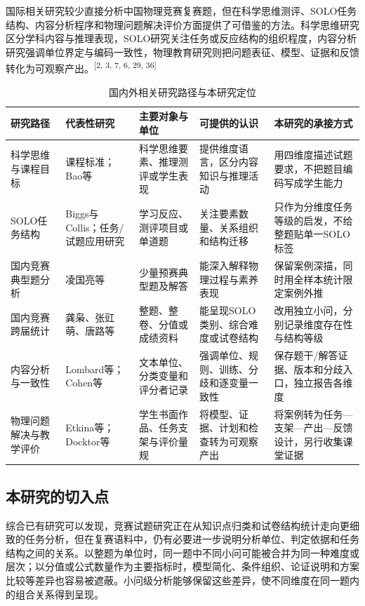 \documentclass[
  12pt,
  a4paper,twoside,openany]{ctexbook}
\renewcommand{\arraystretch}{1.22}
\begin{document}
国际相关研究较少直接分析中国物理竞赛复赛题，但在科学思维测评、SOLO任务结构、内容分析程序和物理问题解决评价方面提供了可借鉴的方法。科学思维研究区分学科内容与推理表现，SOLO研究关注任务或反应结构的组织程度，内容分析研究强调单位界定与编码一致性，物理教育研究则把问题表征、模型、证据和反馈转化为可观察产出。\textsuperscript{[2, 3, 7, 6, 29, 36]}

\begin{table}[H]
\centering
\caption{国内外相关研究路径与本研究定位}
\label{tab:literature-paths}
\scriptsize
\setlength{\tabcolsep}{2pt}
\renewcommand{\arraystretch}{1.12}
\begin{tabular}{p{2.1cm}p{2.5cm}p{2.5cm}p{2.9cm}p{2.9cm}}
\toprule
研究路径 & 代表性研究 & 主要对象与单位 & 可提供的认识 & 本研究的承接方式 \\
\midrule
科学思维与课程目标 & 课程标准；Bao等 & 科学思维要素、推理测评或学生表现 & 提供维度语言，区分内容知识与推理活动 & 用四维度描述试题要求，不把题目编码写成学生能力 \\
SOLO任务结构 & Biggs与Collis；任务/试题应用研究 & 学习反应、测评项目或单道题 & 关注要素数量、关系组织和结构迁移 & 只作为分维度任务等级的启发，不给整题贴单一SOLO标签 \\
国内竞赛典型题分析 & 凌国亮等 & 少量预赛典型题及解答 & 能深入解释物理过程与素养表现 & 保留案例深描，同时用全样本统计限定案例外推 \\
国内竞赛跨届统计 & 龚枭、张豇萌、唐路等 & 整题、整卷、分值或成绩资料 & 能呈现SOLO类别、综合难度或试卷结构 & 改用独立小问，分别记录维度存在性与结构等级 \\
内容分析与一致性 & Lombard等；Cohen等 & 文本单位、分类变量和评分者记录 & 强调单位、规则、训练、分歧和逐变量一致性 & 保存题干/解答证据、版本和分歧入口，独立报告各维度 \\
物理问题解决与教学评价 & Etkina等；Docktor等 & 学生书面作品、任务支架与评价量规 & 将模型、证据、计划和检查转为可观察产出 & 将案例转为任务—支架—产出—反馈设计，另行收集课堂证据 \\
\bottomrule
\end{tabular}
\end{table}

\subsection{本研究的切入点}\label{ux672cux7814ux7a76ux7684ux5207ux5165ux70b9}

综合已有研究可以发现，竞赛试题研究正在从知识点归类和试卷结构统计走向更细致的任务分析，但在复赛语料中，仍有必要进一步说明分析单位、判定依据和任务结构之间的关系。以整题为单位时，同一题中不同小问可能被合并为同一种难度或层次；以分值或公式数量作为主要指标时，模型简化、条件组织、论证说明和方案比较等差异也容易被遮蔽。小问级分析能够保留这些差异，使不同维度在同一题内的组合关系得到呈现。
\end{document}
